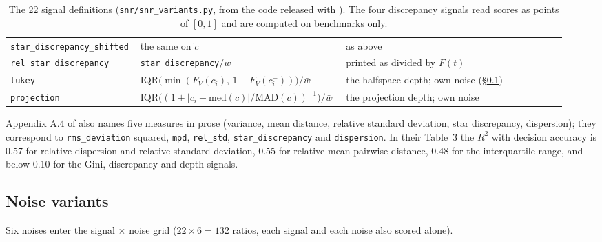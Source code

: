 \begin{table}[h]
\begin{tabular}{@{}p{0.19\linewidth}p{0.36\linewidth}p{0.39\linewidth}@{}}
\texttt{star\_discrepancy\_shifted} & the same on $\tilde{c}$ & as above \\
\texttt{rel\_star\_discrepancy} & \texttt{star\_discrepancy}$/\bar{w}$ & printed as divided by $F(t)$ \\
\texttt{tukey} & $\mathrm{IQR}\big(\min(F_V(c_i),\, 1 - F_V(c_i^-))\big)/\bar{w}$ & the halfspace depth; own noise (\S\ref{app:sur-noise}) \\
\texttt{projection} & $\mathrm{IQR}\big((1 + |c_i - \mathrm{med}(c)|/\mathrm{MAD}(c))^{-1}\big)/\bar{w}$ & the projection depth; own noise \\
\bottomrule
\end{tabular}
\caption{The 22 signal definitions (\texttt{snr/snr\_variants.py}, from the code released with \citet{heineman_signal_2025}). The four discrepancy signals read scores as points of $[0,1]$ and are computed on benchmarks only.}
\label{tab:sur-signals}
\end{table}

Appendix A.4 of \citet{heineman_signal_2025} also names five measures in prose (variance, mean distance, relative standard deviation, star discrepancy, dispersion); they correspond to \texttt{rms\_deviation} squared, \texttt{mpd}, \texttt{rel\_std}, \texttt{star\_discrepancy} and \texttt{dispersion}.
In their Table~3 the $R^2$ with decision accuracy is 0.57 for relative dispersion and relative standard deviation, 0.55 for relative mean pairwise distance, 0.48 for the interquartile range, and below 0.10 for the Gini, discrepancy and depth signals.

\subsection{Noise variants}
\label{app:sur-noise}

Six noises enter the signal $\times$ noise grid ($22 \times 6 = 132$ ratios, each signal and each noise also scored alone).

